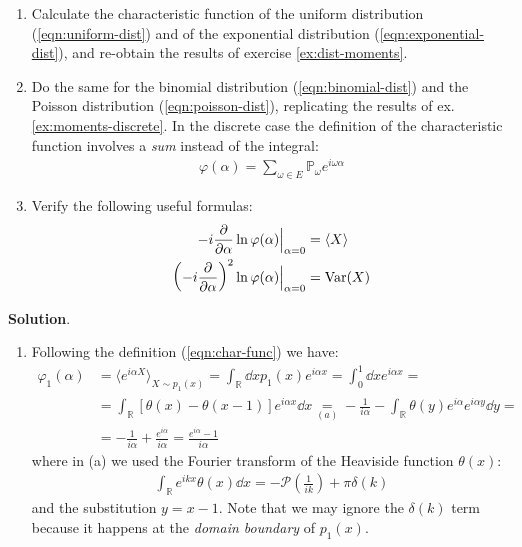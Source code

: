 \documentclass[../template.tex]{subfiles}
\begin{document}
\begin{exo}
    \begin{enumerate}[label=\alph*.]
        \item Calculate the characteristic function of the uniform distribution (\ref{eqn:uniform-dist}) and of the exponential distribution (\ref{eqn:exponential-dist}), and re-obtain the results of exercise \ref{ex:dist-moments}.
        \item Do the same for the binomial distribution (\ref{eqn:binomial-dist}) and the Poisson distribution (\ref{eqn:poisson-dist}), replicating the results of ex. \ref{ex:moments-discrete}. In the discrete case the definition of the characteristic function involves a \textit{sum} instead of the integral:
        \begin{align*}
            \varphi(\alpha) = \sum_{\omega \in E} \mathbb{P}_\omega e^{i \omega \alpha}
        \end{align*} 
        \item Verify the following useful formulas:
        \begin{subequations}
            \begin{align}\label{eqn:f1}
                -i\pdv{\alpha} \ln\varphi(\alpha) \Big|_{\alpha = 0} &= \langle X \rangle\\
                \left(-i\pdv{\alpha}\right)^2 \ln\varphi(\alpha) \Big|_{\alpha = 0} &= \operatorname{Var}(X) \label{eqn:f2}
            \end{align}
        \end{subequations}
    \end{enumerate}
    
    \medskip

    \textbf{Solution}.
    \begin{enumerate}[label=\alph*.]
        \item Following the definition (\ref{eqn:char-func}) we have:
        \begin{align*}
            \varphi_1(\alpha) &= \langle e^{i \alpha X} \rangle_{X \sim p_1(x)} = \int_\mathbb{R} \dd{x} p_1(x) e^{i \alpha x} = \int_0^1 \dd{x} e^{i \alpha x} =\\
            &= \int_{\mathbb{R}} [\theta(x) - \theta(x-1)] e^{i \alpha x}\dd{x} \underset{(a)}{=} - \frac{1}{i \alpha} - \int_{\mathbb{R}} \theta(y) e^{i \alpha} e^{i \alpha y} \dd{y} =\\
            &=- \frac{1}{i \alpha} + \frac{e^{i \alpha}}{i \alpha} = \frac{e^{i \alpha} - 1}{i \alpha}   
        \end{align*}
        where in (a) we used the Fourier transform of the Heaviside function $\theta(x)$:
        \begin{align*}
            \int_{\mathbb{R}} e^{i k x} \theta(x) \dd{x} = -\mathcal{P}\left(\frac{1}{ik}\right) + \pi \delta(k)
        \end{align*}
        and the substitution $y = x-1$. Note that we may ignore the $\delta(k)$ term because it happens at the \textit{domain boundary} of $p_1(x)$.


\end{enumerate}
\end{exo}
\end{document}
